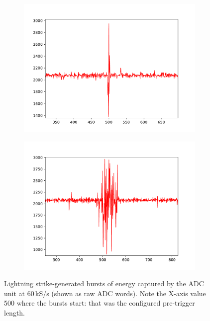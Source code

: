 \begin{figure}[h]
\begin{subfigure}{.5\textwidth}
	\includegraphics[width=\textwidth]{img/strike3}
	\end{subfigure}%
	\begin{subfigure}{.5\textwidth}
	\includegraphics[width=\textwidth]{img/strike4}
	\end{subfigure}
	\caption[Captured lightning strikes]{Lightning strike-generated bursts of energy captured by the ADC unit at 60\,kS/s (shown as raw ADC words). Note the X-axis value 500 where the bursts start: that was the configured pre-trigger length.}
	\label{fig:strikes}
\end{figure}











